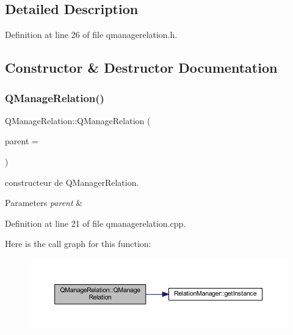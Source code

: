 \subsection{Detailed Description}


Definition at line 26 of file qmanagerelation.\+h.



\subsection{Constructor \& Destructor Documentation}
\mbox{\label{class_q_manage_relation_af470c7a01389927cd834432d4d37f5c9}} 
\subsubsection{\texorpdfstring{Q\+Manage\+Relation()}{QManageRelation()}}
{\footnotesize\ttfamily Q\+Manage\+Relation\+::\+Q\+Manage\+Relation (\begin{DoxyParamCaption}\item[{Q\+Widget $\ast$}]{parent = {} }\end{DoxyParamCaption})\hspace{0.3cm}{\ttfamily [explicit]}}



constructeur de Q\+Manager\+Relation. 


\begin{DoxyParams}{Parameters}
{\em parent} & \\
\hline
\end{DoxyParams}


Definition at line 21 of file qmanagerelation.\+cpp.

Here is the call graph for this function\+:\nopagebreak
\begin{figure}[H]
\begin{center}
\leavevmode
\includegraphics[width=350pt]{class_q_manage_relation_af470c7a01389927cd834432d4d37f5c9_cgraph}
\end{center}
\end{figure}


